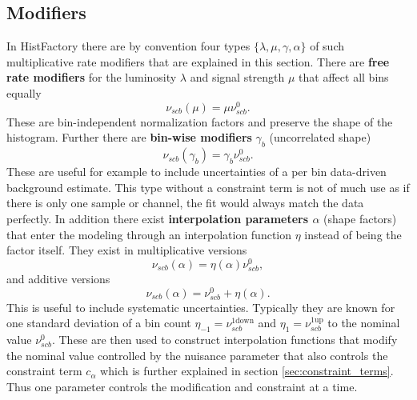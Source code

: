 \subsection{Modifiers}\label{sec:modifiers}
In HistFactory there are by convention four types $\{\lambda,\mu,\gamma,\alpha\}$ of such multiplicative rate modifiers that are explained in this section. There are \textbf{free rate modifiers} for the luminosity $\lambda$ and signal strength $\mu$ that affect all bins equally
\begin{equation}
    \nu_{scb}(\mu)=\mu \nu_{scb}^0.
\end{equation}
These are bin-independent normalization factors and preserve the shape of the histogram.
Further there are \textbf{bin-wise modifiers} $\gamma_b$ (uncorrelated shape)
\begin{equation}
    \nu_{scb}(\gamma_b)=\gamma_b \nu_{scb}^0.
\end{equation}
These are useful for example to include uncertainties of a per bin data-driven background estimate. This type without a constraint term is not of much use as if there is only one sample or channel, the fit would always match the data perfectly.
In addition there exist \textbf{interpolation parameters $\alpha$} (shape factors) that enter the modeling through an interpolation function $\eta$ instead of being the factor itself. They exist in multiplicative versions
\begin{equation}
    \nu_{scb}(\alpha)=\eta(\alpha) \nu_{scb}^0,
\end{equation}
and additive versions
\begin{equation}
    \nu_{scb}(\alpha)=\nu_{scb}^0 + \eta(\alpha).
\end{equation}
This is useful to include systematic uncertainties. Typically they are known for one standard deviation of a bin count $\eta_{-1}=\nu_{scb}^\mathrm{1down}$ and $\eta_{1}=\nu_{scb}^\mathrm{1up}$ to the nominal value $\nu_{scb}^0$. These are then used to construct interpolation functions that modify the nominal value controlled by the nuisance parameter that also controls the constraint term $c_\alpha$ which is further explained in section \ref{sec:constraint_terms}. Thus one parameter controls the modification and constraint at a time.

